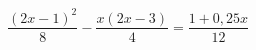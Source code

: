\begin{ex}[type=equation]
	\begin{condition}
		$\dfrac{(2x - 1)^2}{8} - \dfrac{x(2x - 3)}{4} = \dfrac{1  + 0,25x}{12}$
	\end{condition}
\end{ex}